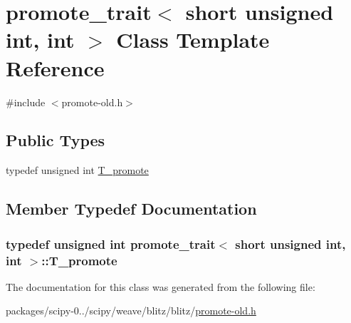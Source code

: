 \hypertarget{classpromote__trait_3_01short_01unsigned_01int_00_01int_01_4}{}\section{promote\+\_\+trait$<$ short unsigned int, int $>$ Class Template Reference}
\label{classpromote__trait_3_01short_01unsigned_01int_00_01int_01_4}


{\ttfamily \#include $<$promote-\/old.\+h$>$}

\subsection*{Public Types}
\begin{DoxyCompactItemize}
\item 
typedef unsigned int \hyperlink{classpromote__trait_3_01short_01unsigned_01int_00_01int_01_4_aba24540a8b27d455a2189392263c2ca8}{T\+\_\+promote}
\end{DoxyCompactItemize}


\subsection{Member Typedef Documentation}
\hypertarget{classpromote__trait_3_01short_01unsigned_01int_00_01int_01_4_aba24540a8b27d455a2189392263c2ca8}{}
\subsubsection[{T\+\_\+promote}]{\setlength{\rightskip}{0pt plus 5cm}typedef unsigned int {\bf promote\+\_\+trait}$<$ short unsigned int, int $>$\+::{\bf T\+\_\+promote}}\label{classpromote__trait_3_01short_01unsigned_01int_00_01int_01_4_aba24540a8b27d455a2189392263c2ca8}


The documentation for this class was generated from the following file\+:\begin{DoxyCompactItemize}
\item 
packages/scipy-\/0../scipy/weave/blitz/blitz/\hyperlink{promote-old_8h}{promote-\/old.\+h}\end{DoxyCompactItemize}
